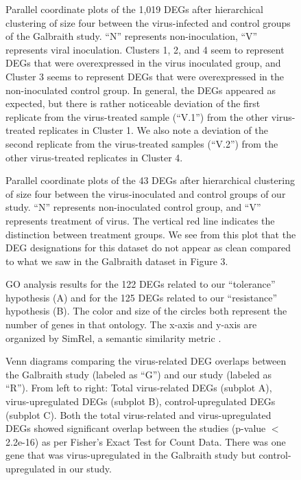 \documentclass{bmcart}
\begin{document}
\begin{linenumbers}
\begin{backmatter}
\begin{figure}[h!]
\caption{
Parallel coordinate plots of the 1,019 DEGs after hierarchical clustering of size four between the virus-infected and control groups of the Galbraith study. ``N'' represents non-inoculation, ``V'' represents viral inoculation. Clusters 1, 2, and 4 seem to represent DEGs that were overexpressed in the virus inoculated group, and Cluster 3 seems to represent DEGs that were overexpressed in the non-inoculated control group. In general, the DEGs appeared as expected, but there is rather noticeable deviation of the first replicate from the virus-treated sample (``V.1'') from the other virus-treated replicates in Cluster 1. We also note a deviation of the second replicate from the virus-treated samples (``V.2'') from the other virus-treated replicates in Cluster 4.}
\end{figure}

\begin{figure}[h!]
\caption{
Parallel coordinate plots of the 43 DEGs after hierarchical clustering of size four between the virus-inoculated and control groups of our study. ``N'' represents non-inoculated control group, and ``V'' represents treatment of virus. The vertical red line indicates the distinction between treatment groups. We see from this plot that the DEG designations for this dataset do not appear as clean compared to what we saw in the Galbraith dataset in Figure 3.}
\end{figure}

\begin{figure}[h!]
\caption{
GO analysis results for the 122 DEGs related to our ``tolerance'' hypothesis (A) and for the 125 DEGs related to our ``resistance'' hypothesis (B). The color and size of the circles both represent the number of genes in that ontology. The x-axis and y-axis are organized by SimRel, a semantic similarity metric \cite{semantic}.}
\end{figure}

\begin{figure}[h!]
\caption{
Venn diagrams comparing the virus-related DEG overlaps between the Galbraith study (labeled as ``G'') and our study (labeled as ``R''). From left to right: Total virus-related DEGs (subplot A), virus-upregulated DEGs (subplot B), control-upregulated DEGs (subplot C). Both the total virus-related and virus-upregulated DEGs showed significant overlap between the studies (p-value $<$ 2.2e-16) as per Fisher's Exact Test for Count Data. There was one gene that was virus-upregulated in the Galbraith study but control-upregulated in our study.}
\end{figure}


\end{backmatter}
\end{linenumbers}
\end{document}
